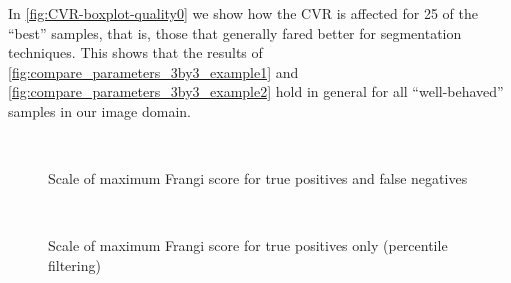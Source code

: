 In \cref{fig:CVR-boxplot-quality0} we show how the CVR is affected for 25 of the ``best'' samples, that is, those that generally fared better for segmentation techniques. This shows that the  results of \cref{fig:compare_parameters_3by3_example1} and \cref{fig:compare_parameters_3by3_example2} hold in general for all ``well-behaved'' samples in our image domain. 
\begin{figure}[p]\centering
  \\[-0.5cm]
  \caption{Scale of maximum Frangi score for true positives and false negatives}
\end{figure}

\begin{figure}[p]\centering
  \\[-0.5cm]
  \caption{Scale of maximum Frangi score for true positives only (percentile filtering)}
\end{figure}
